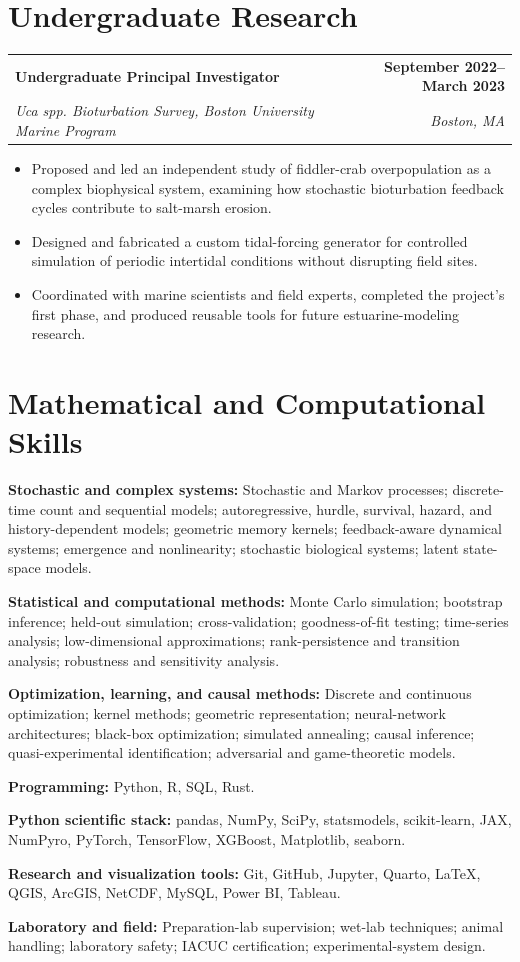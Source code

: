 \documentclass[10pt,letterpaper]{article}
\makeatletter
\newcommand{\entry}[4]{%
  \begin{tabularx}{\textwidth}{@{}Xr@{}}
    \textbf{#1} & \textbf{#2} \\
    \textit{#3} & \textit{#4}
  \end{tabularx}\vspace{-2pt}
}
\newcommand{\skill}[2]{\textbf{#1:} #2\par\vspace{2pt}}
\makeatother
\begin{document}
\section*{Undergraduate Research}
\entry{Undergraduate Principal Investigator}{September 2022--March 2023}{\textit{Uca spp.} Bioturbation Survey, Boston University Marine Program}{Boston, MA}
\begin{itemize}
  \item Proposed and led an independent study of fiddler-crab overpopulation as a complex biophysical system, examining how stochastic bioturbation feedback cycles contribute to salt-marsh erosion.
  \item Designed and fabricated a custom tidal-forcing generator for controlled simulation of periodic intertidal conditions without disrupting field sites.
  \item Coordinated with marine scientists and field experts, completed the project's first phase, and produced reusable tools for future estuarine-modeling research.
\end{itemize}

\section*{Mathematical and Computational Skills}
\skill{Stochastic and complex systems}{Stochastic and Markov processes; discrete-time count and sequential models; autoregressive, hurdle, survival, hazard, and history-dependent models; geometric memory kernels; feedback-aware dynamical systems; emergence and nonlinearity; stochastic biological systems; latent state-space models.}
\skill{Statistical and computational methods}{Monte Carlo simulation; bootstrap inference; held-out simulation; cross-validation; goodness-of-fit testing; time-series analysis; low-dimensional approximations; rank-persistence and transition analysis; robustness and sensitivity analysis.}
\skill{Optimization, learning, and causal methods}{Discrete and continuous optimization; kernel methods; geometric representation; neural-network architectures; black-box optimization; simulated annealing; causal inference; quasi-experimental identification; adversarial and game-theoretic models.}
\skill{Programming}{Python, R, SQL, Rust.}
\skill{Python scientific stack}{pandas, NumPy, SciPy, statsmodels, scikit-learn, JAX, NumPyro, PyTorch, TensorFlow, XGBoost, Matplotlib, seaborn.}
\skill{Research and visualization tools}{Git, GitHub, Jupyter, Quarto, LaTeX, QGIS, ArcGIS, NetCDF, MySQL, Power BI, Tableau.}
\skill{Laboratory and field}{Preparation-lab supervision; wet-lab techniques; animal handling; laboratory safety; IACUC certification; experimental-system design.}
\end{document}
